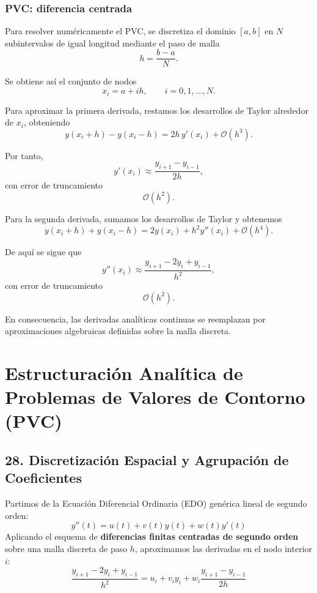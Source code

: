 \documentclass[12pt]{article}
\begin{document}
\subsubsection*{PVC: diferencia centrada}

Para resolver numéricamente el PVC, se discretiza el dominio $[a,b]$ en
$N$ subintervalos de igual longitud mediante el paso de malla
\[
h=\frac{b-a}{N}.
\]

Se obtiene así el conjunto de nodos
\[
x_i=a+ih,
\qquad i=0,1,\ldots,N.
\]

Para aproximar la primera derivada, restamos los desarrollos de Taylor
alrededor de $x_i$, obteniendo
\[
y(x_i+h)-y(x_i-h)
=
2h\,y'(x_i)+\mathcal{O}(h^3).
\]

Por tanto,
\[
\boxed{
y'(x_i)\approx
\frac{y_{i+1}-y_{i-1}}{2h},
}
\tag{25}
\]
con error de truncamiento
\[
\boxed{
\mathcal{O}(h^2).
}
\]

Para la segunda derivada, sumamos los desarrollos de Taylor y obtenemos
\[
y(x_i+h)+y(x_i-h)
=
2y(x_i)+h^2y''(x_i)+\mathcal{O}(h^4).
\]

De aquí se sigue que
\[
\boxed{
y''(x_i)\approx
\frac{y_{i+1}-2y_i+y_{i-1}}{h^2},
}
\tag{26}
\]
con error de truncamiento
\[
\boxed{
\mathcal{O}(h^2).
}
\]

En consecuencia, las derivadas analíticas continuas se reemplazan por
aproximaciones algebraicas definidas sobre la malla discreta.

\section*{Estructuración Analítica de Problemas de Valores de Contorno (PVC)}

\subsection*{28. Discretización Espacial y Agrupación de Coeficientes}
Partimos de la Ecuación Diferencial Ordinaria (EDO) genérica lineal de segundo orden:
\begin{equation}
    y''(t) = u(t) + v(t)y(t) + w(t)y'(t)
\end{equation}
Aplicando el esquema de \textbf{diferencias finitas centradas de segundo orden} sobre una malla discreta de paso $h$, aproximamos las derivadas en el nodo interior $i$:
\begin{equation}
    \frac{y_{i+1} - 2y_i + y_{i-1}}{h^2} = u_i + v_i y_i + w_i \frac{y_{i+1} - y_{i-1}}{2h}
\end{equation}
\end{document}
